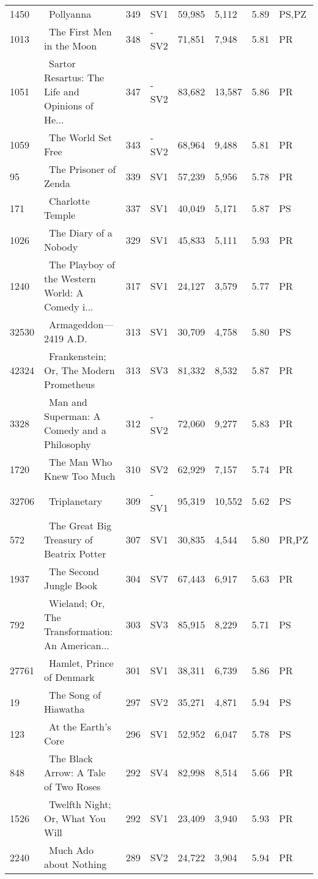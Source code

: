\begin{longtable}{l | l | l | l | l | l | l | l}
1450 & ~Pollyanna & 349 & SV1 & 59,985 & 5,112 & 5.89 & PS,PZ\\
1013 & ~The First Men in the Moon & 348 & -SV2 & 71,851 & 7,948 & 5.81 & PR\\
1051 & ~Sartor Resartus: The Life and Opinions of He... & 347 & -SV2 & 83,682 & 13,587 & 5.86 & PR\\
1059 & ~The World Set Free & 343 & -SV2 & 68,964 & 9,488 & 5.81 & PR\\
95 & ~The Prisoner of Zenda & 339 & SV1 & 57,239 & 5,956 & 5.78 & PR\\
171 & ~Charlotte Temple & 337 & SV1 & 40,049 & 5,171 & 5.87 & PS\\
1026 & ~The Diary of a Nobody & 329 & SV1 & 45,833 & 5,111 & 5.93 & PR\\
1240 & ~The Playboy of the Western World: A Comedy i... & 317 & SV1 & 24,127 & 3,579 & 5.77 & PR\\
32530 & ~Armageddon—2419 A.D. & 313 & SV1 & 30,709 & 4,758 & 5.80 & PS\\
42324 & ~Frankenstein; Or, The Modern Prometheus & 313 & SV3 & 81,332 & 8,532 & 5.87 & PR\\
3328 & ~Man and Superman: A Comedy and a Philosophy & 312 & -SV2 & 72,060 & 9,277 & 5.83 & PR\\
1720 & ~The Man Who Knew Too Much & 310 & SV2 & 62,929 & 7,157 & 5.74 & PR\\
32706 & ~Triplanetary & 309 & -SV1 & 95,319 & 10,552 & 5.62 & PS\\
572 & ~The Great Big Treasury of Beatrix Potter & 307 & SV1 & 30,835 & 4,544 & 5.80 & PR,PZ\\
1937 & ~The Second Jungle Book & 304 & SV7 & 67,443 & 6,917 & 5.63 & PR\\
792 & ~Wieland; Or, The Transformation: An American... & 303 & SV3 & 85,915 & 8,229 & 5.71 & PS\\
27761 & ~Hamlet, Prince of Denmark & 301 & SV1 & 38,311 & 6,739 & 5.86 & PR\\
19 & ~The Song of Hiawatha & 297 & SV2 & 35,271 & 4,871 & 5.94 & PS\\
123 & ~At the Earth's Core & 296 & SV1 & 52,952 & 6,047 & 5.78 & PS\\
848 & ~The Black Arrow: A Tale of Two Roses & 292 & SV4 & 82,998 & 8,514 & 5.66 & PR\\
1526 & ~Twelfth Night; Or, What You Will & 292 & SV1 & 23,409 & 3,940 & 5.93 & PR\\
2240 & ~Much Ado about Nothing & 289 & SV2 & 24,722 & 3,904 & 5.94 & PR\\

\end{longtable}
